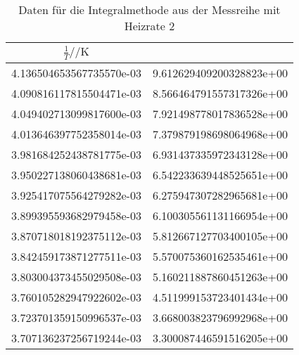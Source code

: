 \begin{table}
 \centering
 \begin{tabular}{S[round-mode = places , round-precision = 4,scientific-notation=fixed, fixed-exponent = 0] S[round-mode = places , round-precision = 0,scientific-notation=fixed, fixed-exponent = 0]}
   \toprule
	$\frac{1}{T} / \si{\per\kelvin}$ &
    \\
   \midrule
	4.136504653567735570e-03 & 9.612629409200328823e+00\\
	4.090816117815504471e-03 & 8.566464791557317326e+00\\
	4.049402713099817600e-03 & 7.921498778017836528e+00\\
	4.013646397752358014e-03 & 7.379879198698064968e+00\\
	3.981684252438781775e-03 & 6.931437335972343128e+00\\
	3.950227138060438681e-03 & 6.542233639448525651e+00\\
	3.925417075564279282e-03 & 6.275947307282965681e+00\\
	3.899395593682979458e-03 & 6.100305561131166954e+00\\
	3.870718018192375112e-03 & 5.812667127703400105e+00\\
	3.842459173871277511e-03 & 5.570075360162535461e+00\\
	3.803004373455029508e-03 & 5.160211887860451263e+00\\
	3.760105282947922602e-03 & 4.511999153723401434e+00\\
	3.723701359150996537e-03 & 3.668003823796992968e+00\\
	3.707136237256719244e-03 & 3.300087446591516205e+00\\
   \bottomrule
 \end{tabular}
 \caption{Daten für die Integralmethode aus der Messreihe mit Heizrate 2}
 \label{tab:WM22tab}
\end{table}


